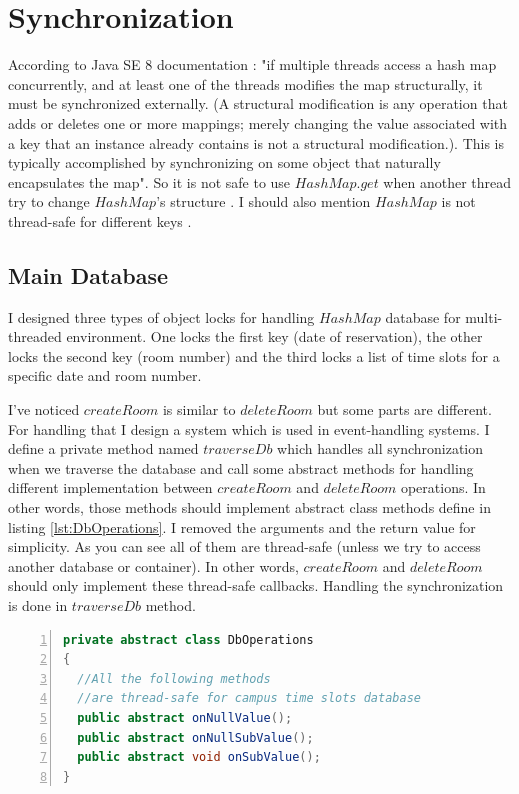 \documentclass[12pt]{article}
\begin{document}
\section{Synchronization}
According to Java SE 8 documentation \cite{hashmap}: "if multiple threads access a hash map concurrently, and at least one of the threads modifies the map structurally, it must be synchronized externally. (A structural modification is any operation that adds or deletes one or more mappings; merely changing the value associated with a key that an instance already contains is not a structural modification.). This is typically accomplished by synchronizing on some object that naturally encapsulates the map". So it is not safe to use $HashMap.get$ when another thread try to change $HashMap$'s structure \cite{hashmap-multithread-get}. I should also mention $HashMap$ is not thread-safe for different keys \cite{hashmap-multithread-different-keys}.
\subsection{Main Database}
I designed three types of object locks for handling $HashMap$ database for multi-threaded environment. One locks the first key (date of reservation), the other locks the second key (room number) and the third locks a list of time slots for a specific date and room number.
\par I've noticed $createRoom$ is similar to $deleteRoom$ but some parts are different. For handling that I design a system which is used in event-handling systems. I define a private method named $traverseDb$ which handles all synchronization when we traverse the database and call some abstract methods for handling different implementation between $createRoom$ and $deleteRoom$ operations. In other words, those methods should implement abstract class methods define in listing \ref{lst:DbOperations}. I removed the arguments and the return value for simplicity. As you can see all of them are thread-safe (unless we try to access another database or container). In other words, $createRoom$ and $deleteRoom$ should only implement these thread-safe callbacks. Handling the synchronization is done in $traverseDb$ method.

\begin{lstlisting}[language=java,label={lst:DbOperations},caption={DbOperations abstract class},numbers=left]
private abstract class DbOperations
{
  //All the following methods 
  //are thread-safe for campus time slots database
  public abstract onNullValue();
  public abstract onNullSubValue();
  public abstract void onSubValue();
}
\end{lstlisting}
\end{document}
